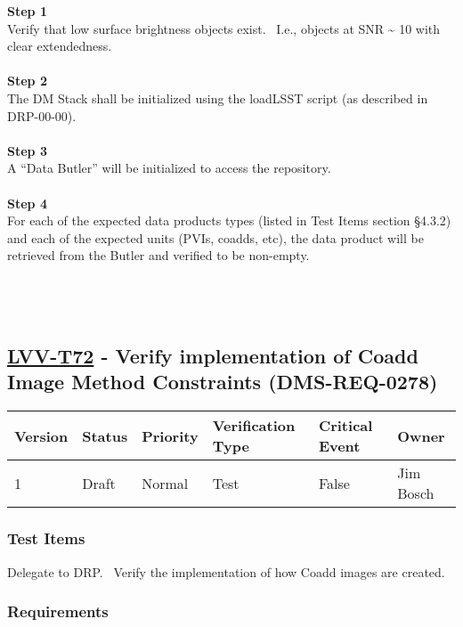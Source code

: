\textbf{Step 1}\\
Verify that low surface brightness objects exist. ~I.e., objects at SNR
\textasciitilde{} 10 with clear extendedness.\\
~\\
\textbf{Step 2}\\
The DM Stack shall be initialized using the loadLSST script (as
described in DRP-00-00).\\
~\\
\textbf{Step 3}\\
A ``Data Butler'' will be initialized to access the repository.\\
~\\
\textbf{Step 4}\\
For each of the expected data products types (listed in Test Items
section §4.3.2) and each of the expected units (PVIs, coadds, etc), the
data product will be retrieved from the Butler and verified to be
non-empty.\\
~\\
~\\
~\\

\hypertarget{lvv-t72---verify-implementation-of-coadd-image-method-constraints-dms-req-0278}{%
\subsection{\texorpdfstring{\href{https://jira.lsstcorp.org/secure/Tests.jspa\#/testCase/LVV-T72}{LVV-T72}
- Verify implementation of Coadd Image Method Constraints
(DMS-REQ-0278)}{LVV-T72 - Verify implementation of Coadd Image Method Constraints (DMS-REQ-0278)}}\label{lvv-t72---verify-implementation-of-coadd-image-method-constraints-dms-req-0278}}

\begin{longtable}[]{@{}llllll@{}}
\toprule
Version & Status & Priority & Verification Type & Critical Event &
Owner\tabularnewline
\midrule
\endhead
1 & Draft & Normal & Test & False & Jim Bosch\tabularnewline
\bottomrule
\end{longtable}

\hypertarget{test-items-161}{%
\subsubsection{Test Items}\label{test-items-161}}

Delegate to DRP. ~Verify the implementation of how Coadd images are
created.

\hypertarget{requirements-162}{%
\subsubsection{Requirements}\label{requirements-162}}

